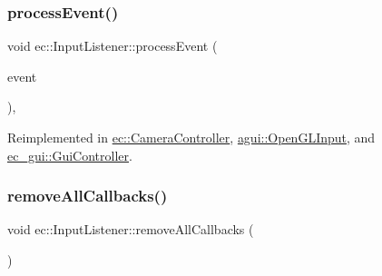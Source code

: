 \mbox{\label{classec_1_1_input_listener_a9ceaefc79c6b0b260e88454616137840}} 
\subsubsection{\texorpdfstring{process\+Event()}{processEvent()}}
{\footnotesize\ttfamily void ec\+::\+Input\+Listener\+::process\+Event (\begin{DoxyParamCaption}\item[{const \mbox{\hyperlink{structec_1_1_input_event}{Input\+Event}} \&}]{event }\end{DoxyParamCaption})\hspace{0.3cm}{\ttfamily [protected]}, {\ttfamily [virtual]}}



Reimplemented in \mbox{\hyperlink{classec_1_1_camera_controller_af44aad5f80005eaadf5d637b3b00c6d6}{ec\+::\+Camera\+Controller}}, \mbox{\hyperlink{classagui_1_1_open_g_l_input_aeb8c519c7fb7791295531b12948d4390}{agui\+::\+Open\+G\+L\+Input}}, and \mbox{\hyperlink{classec__gui_1_1_gui_controller_a3435c1c74eff0dc75c27142d0d86b4c5}{ec\+\_\+gui\+::\+Gui\+Controller}}.

\mbox{\label{classec_1_1_input_listener_ab3c4085477da60677e0a0659f750ead4}} 
\subsubsection{\texorpdfstring{remove\+All\+Callbacks()}{removeAllCallbacks()}}
{\footnotesize\ttfamily void ec\+::\+Input\+Listener\+::remove\+All\+Callbacks (\begin{DoxyParamCaption}{ }\end{DoxyParamCaption})}

\mbox{\label{classec_1_1_input_listener_a8b59eb3a5b89db5a59351cc9ea20c01a}} 
